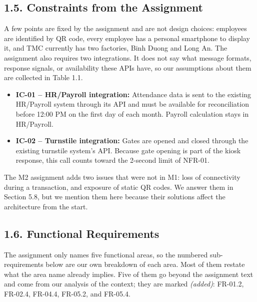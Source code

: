 \subsection*{1.5. Constraints from the Assignment}

{}

A few points are fixed by the assignment and are not design choices: employees are identified by QR code, every employee has a personal smartphone to display it, and TMC currently has two factories, Binh Duong and Long An. The assignment also requires two integrations. It does not say what message formats, response signals, or availability these APIs have, so our assumptions about them are collected in Table 1.1.

\begin{itemize}[leftmargin=36pt, itemsep=2pt, topsep=4pt, parsep=2pt]
  \item \textbf{IC-01 -- HR/Payroll integration:} Attendance data is sent to the existing HR/Payroll system through its API and must be available for reconciliation before 12:00 PM on the first day of each month. Payroll calculation stays in HR/Payroll.
  \item \textbf{IC-02 -- Turnstile integration:} Gates are opened and closed through the existing turnstile system's API. Because gate opening is part of the kiosk response, this call counts toward the 2-second limit of NFR-01.
\end{itemize}

The M2 assignment adds two issues that were not in M1: loss of connectivity during a transaction, and exposure of static QR codes. We answer them in Section 5.8, but we mention them here because their solutions affect the architecture from the start.

\subsection*{1.6. Functional Requirements}

{}

The assignment only names five functional areas, so the numbered sub-requirements below are our own breakdown of each area. Most of them restate what the area name already implies. Five of them go beyond the assignment text and come from our analysis of the context; they are marked \textit{(added)}: FR-01.2, FR-02.4, FR-04.4, FR-05.2, and FR-05.4.

